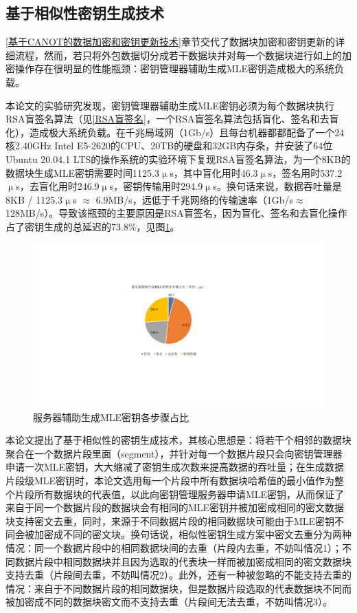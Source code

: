 \documentclass[promaster]{thesis-uestc}
\begin{document}
\subsection{基于相似性密钥生成技术}
\ref{基于CANOT的数据加密和密钥更新技术}章节交代了数据块加密和密钥更新的详细流程，然而，若只将外包数据切分成若干数据块并对每一个数据块进行如上的加密操作存在很明显的性能瓶颈：密钥管理器辅助生成MLE密钥造成极大的系统负载。

本论文的实验研究发现，密钥管理器辅助生成MLE密钥必须为每个数据块执行RSA盲签名算法（见\ref{RSA盲签名}，一个RSA盲签名算法包括盲化、签名和去盲化），造成极大系统负载。在千兆局域网（1Gb/s）且每台机器都都配备了一个24核2.40GHz Intel E5-2620的CPU、20TB的硬盘和32GB内存条，并安装了64位Ubuntu 20.04.1 LTS的操作系统的实验环境下复现RSA盲签名算法，为一个8KB的数据块生成MLE密钥需要时间1125.3$\upmu$s，其中盲化用时46.3$\upmu$s，签名用时537.2$\upmu$s，去盲化用时246.9$\upmu$s，密钥传输用时294.9$\upmu$s。换句话来说，数据吞吐量是8KB / 1125.3$\upmu$s $\approx$ 6.9MB/s，远低于千兆网络的传输速率（1Gb/s$\approx$128MB/s）。导致该瓶颈的主要原因是RSA盲签名，因为盲化、签名和去盲化操作占了密钥生成的总延迟的73.8\%，见图\ref{服务器辅助生成MLE密钥各步骤占比}。

\begin{figure}[htbp]
    \centering
    \includegraphics[width = 0.55\linewidth]{pic/服务器辅助生成MLE密钥各步骤占比.pdf}
    \caption{服务器辅助生成MLE密钥各步骤占比}
    \label{服务器辅助生成MLE密钥各步骤占比}
\end{figure}

本论文提出了基于相似性的密钥生成技术，其核心思想是：将若干个相邻的数据块聚合在一个数据片段里面（segment），并针对每一个数据片段只会向密钥管理器申请一次MLE密钥，大大缩减了密钥生成次数来提高数据的吞吐量；在生成数据片段级MLE密钥时，本论文选用每一个片段中所有数据块哈希值的最小值作为整个片段所有数据块的代表值，以此向密钥管理服务器申请MLE密钥，从而保证了来自于同一个数据片段的数据块会有相同的MLE密钥并被加密成相同的密文数据块支持密文去重，同时，来源于不同数据片段的相同数据块可能由于MLE密钥不同会被加密成不同的密文块。换句话说，相似性密钥生成方案中密文去重分为两种情况：同一个数据片段中的相同数据块间的去重（片段内去重，不妨叫情况1）；不同数据片段中相同数据块并且因为选取的代表块一样而被加密成相同的密文数据块支持去重（片段间去重，不妨叫情况2）。此外，还有一种被忽略的不能支持去重的情况：来自于不同数据片段的相同数据块，但是数据片段选取的代表数据块不同而被加密成不同的数据块密文而不支持去重（片段间无法去重，不妨叫情况3）。
\end{document}
